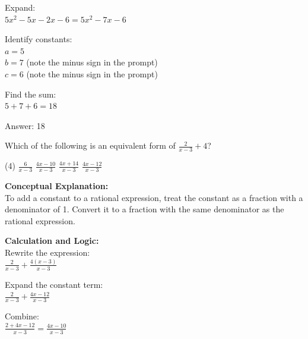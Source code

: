 \documentclass[11pt,paper=a4,answers]{exam}
\begin{document}
\begin{questions}
\begin{solution}
\vspace{10pt}

Expand: \\
$5x^2 - 5x - 2x - 6 = 5x^2 - 7x - 6$

\vspace{10pt}

Identify constants: \\
$a = 5$ \\
$b = 7$ (note the minus sign in the prompt) \\
$c = 6$ (note the minus sign in the prompt)

\vspace{10pt}

Find the sum: \\
$5 + 7 + 6 = 18$

\vspace{25pt}

Answer: \colorbox{yellow!100}{18}
\end{solution}

\vspace{40pt}

\question
Which of the following is an equivalent form of $\frac{2}{x-3} + 4$?
\begin{tasks}(4)
    \task $\frac{6}{x-3}$
    \task $\frac{4x-10}{x-3}$
    \task $\frac{4x+14}{x-3}$
    \task $\frac{4x-12}{x-3}$
\end{tasks}

\begin{solution}
\textbf{Conceptual Explanation:} \\
To add a constant to a rational expression, treat the constant as a fraction with a denominator of 1. Convert it to a fraction with the same denominator as the rational expression.

\vspace{20pt}

\textbf{Calculation and Logic:} \\
Rewrite the expression: \\
$\frac{2}{x-3} + \frac{4(x-3)}{x-3}$

\vspace{10pt}

Expand the constant term: \\
$\frac{2}{x-3} + \frac{4x-12}{x-3}$

\vspace{10pt}

Combine: \\
$\frac{2 + 4x - 12}{x-3} = \frac{4x - 10}{x-3}$


\end{solution}
\end{questions}
\end{document}
